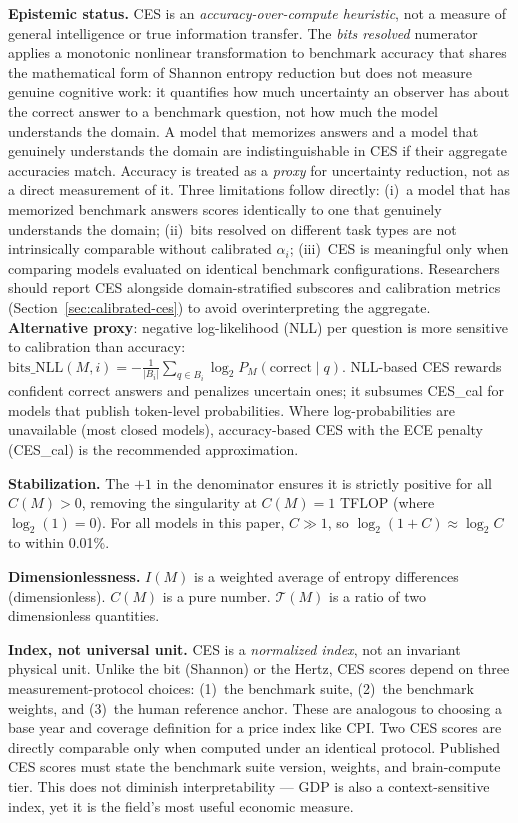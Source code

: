 \documentclass[12pt]{article}
\begin{document}
\noindent\textbf{Epistemic status.} CES is an \textit{accuracy-over-compute heuristic}, not a measure of general intelligence or true information transfer. The \textit{bits resolved} numerator applies a monotonic nonlinear transformation to benchmark accuracy that shares the mathematical form of Shannon entropy reduction but does not measure genuine cognitive work: it quantifies how much uncertainty an observer has about the correct answer to a benchmark question, not how much the model understands the domain. A model that memorizes answers and a model that genuinely understands the domain are indistinguishable in CES if their aggregate accuracies match. Accuracy is treated as a \emph{proxy} for uncertainty reduction, not as a direct measurement of it. Three limitations follow directly: (i)~a model that has memorized benchmark answers scores identically to one that genuinely understands the domain; (ii)~bits resolved on different task types are not intrinsically comparable without calibrated $\alpha_i$; (iii)~CES is meaningful only when comparing models evaluated on identical benchmark configurations. Researchers should report CES alongside domain-stratified subscores and calibration metrics (Section~\ref{sec:calibrated-ces}) to avoid overinterpreting the aggregate. \textbf{Alternative proxy}: negative log-likelihood (NLL) per question is more sensitive to calibration than accuracy: $\text{bits\_NLL}(M,i) = -\frac{1}{|B_i|}\sum_{q \in B_i} \log_2 P_M(\text{correct} \mid q)$. NLL-based CES rewards confident correct answers and penalizes uncertain ones; it subsumes CES\_cal for models that publish token-level probabilities. Where log-probabilities are unavailable (most closed models), accuracy-based CES with the ECE penalty (CES\_cal) is the recommended approximation.

\noindent\textbf{Stabilization.} The $+1$ in the denominator ensures it is strictly positive for all $C(M) > 0$, removing the singularity at $C(M) = 1$ TFLOP (where $\log_2(1) = 0$). For all models in this paper, $C \gg 1$, so $\log_2(1+C) \approx \log_2 C$ to within 0.01\%.

\noindent\textbf{Dimensionlessness.} $I(M)$ is a weighted average of entropy differences (dimensionless). $C(M)$ is a pure number. $\mathcal{T}(M)$ is a ratio of two dimensionless quantities.

\noindent\textbf{Index, not universal unit.} CES is a \textit{normalized index}, not an invariant physical unit. Unlike the bit (Shannon) or the Hertz, CES scores depend on three measurement-protocol choices: (1)~the benchmark suite, (2)~the benchmark weights, and (3)~the human reference anchor. These are analogous to choosing a base year and coverage definition for a price index like CPI. Two CES scores are directly comparable only when computed under an identical protocol. Published CES scores must state the benchmark suite version, weights, and brain-compute tier. This does not diminish interpretability --- GDP is also a context-sensitive index, yet it is the field's most useful economic measure.
\end{document}
